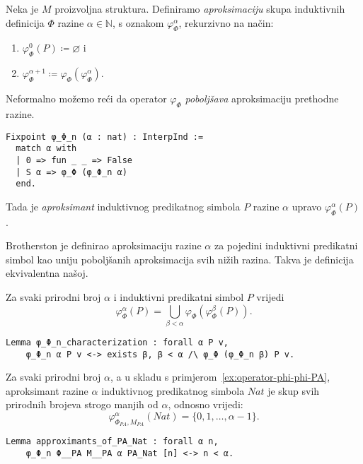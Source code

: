 \begin{definition}
  Neka je \(M\) proizvoljna struktura.
  Definiramo \textit{aproksimaciju} skupa induktivnih definicija \(\Phi\) razine \(\alpha \in \mathbb{N}\), s oznakom \(\varphi_{\Phi}^{\alpha}\), rekurzivno na način:
  \begin{enumerate}
  \item \( \varphi_{\Phi}^{0}(P) \coloneq \varnothing \) i
  \item \( \varphi_{\Phi}^{\alpha + 1} \coloneq \varphi_{\Phi}(\varphi_{\Phi}^{\alpha}) \).
  \end{enumerate}
  \noindent Neformalno možemo reći da operator \(\varphi_{\Phi}\) \textit{poboljšava} aproksimaciju prethodne razine.
\begin{verbatim}
Fixpoint φ_Φ_n (α : nat) : InterpInd :=
  match α with
  | 0 => fun _ _ => False
  | S α => φ_Φ (φ_Φ_n α)
  end.
\end{verbatim}
  \noindent Tada je \textit{aproksimant} induktivnog predikatnog simbola \(P\) razine \(\alpha\) upravo \(\varphi_{\Phi}^{\alpha}(P)\).
\end{definition}

\begin{remark}
  Brotherston je definirao aproksimaciju razine \(\alpha\) za pojedini induktivni predikatni simbol
  kao uniju poboljšanih aproksimacija svih nižih razina.
  Takva je definicija ekvivalentna našoj.
\end{remark}

\begin{lemma}\label{lemma:ekvivalentnost-definicija-aproksimacija}
  Za svaki prirodni broj \(\alpha\) i induktivni predikatni simbol \(P\) vrijedi
  \[
    \varphi_{\Phi}^{\alpha}(P) = \bigcup_{\beta < \alpha} \varphi_{\Phi}(\varphi_{\Phi}^{\beta}(P)).
  \]
\begin{verbatim}
Lemma φ_Φ_n_characterization : forall α P v,
    φ_Φ_n α P v <-> exists β, β < α /\ φ_Φ (φ_Φ_n β) P v.
\end{verbatim}
\end{lemma}

\begin{example}
  Za svaki prirodni broj \(\alpha\), a u skladu s primjerom~\ref{ex:operator-phi-phi-PA},
  aproksimant razine \(\alpha\) induktivnog predikatnog simbola \(\mathit{Nat}\)
  je skup svih prirodnih brojeva strogo manjih od \(\alpha\), odnosno vrijedi:
  \[
    \varphi_{\Phi_{\mathit{PA}}, M_{\mathit{PA}}}^{\alpha}(\mathit{Nat}) = \{ 0, 1, \ldots, \alpha - 1 \}.
  \]
\begin{verbatim}
Lemma approximants_of_PA_Nat : forall α n,
    φ_Φ_n Φ__PA M__PA α PA_Nat [n] <-> n < α.
\end{verbatim}
\end{example}

